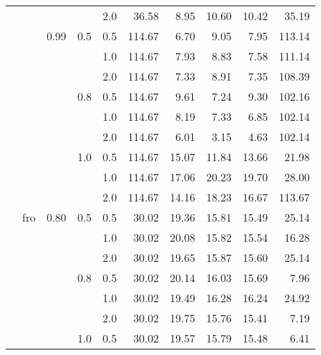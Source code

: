 \documentclass{article}
\begin{document}
{\begin{tabular}{lllllrrrrr}
            &     &      &     & 2.0 &   36.58 &    8.95 &             10.60 &                10.42 &      35.19 \\
            &     & 0.99 & 0.5 & 0.5 &  114.67 &    6.70 &              9.05 &                 7.95 &     113.14 \\
            &     &      &     & 1.0 &  114.67 &    7.93 &              8.83 &                 7.58 &     111.14 \\
            &     &      &     & 2.0 &  114.67 &    7.33 &              8.91 &                 7.35 &     108.39 \\
            &     &      & 0.8 & 0.5 &  114.67 &    9.61 &              7.24 &                 9.30 &     102.16 \\
            &     &      &     & 1.0 &  114.67 &    8.19 &              7.33 &                 6.85 &     102.14 \\
            &     &      &     & 2.0 &  114.67 &    6.01 &              3.15 &                 4.63 &     102.14 \\
            &     &      & 1.0 & 0.5 &  114.67 &   15.07 &             11.84 &                13.66 &      21.98 \\
            &     &      &     & 1.0 &  114.67 &   17.06 &             20.23 &                19.70 &      28.00 \\
            &     &      &     & 2.0 &  114.67 &   14.16 &             18.23 &                16.67 &     113.67 \\
            & fro & 0.80 & 0.5 & 0.5 &   30.02 &   19.36 &             15.81 &                15.49 &      25.14 \\
            &     &      &     & 1.0 &   30.02 &   20.08 &             15.82 &                15.54 &      16.28 \\
            &     &      &     & 2.0 &   30.02 &   19.65 &             15.87 &                15.60 &      25.14 \\
            &     &      & 0.8 & 0.5 &   30.02 &   20.14 &             16.03 &                15.69 &       7.96 \\
            &     &      &     & 1.0 &   30.02 &   19.49 &             16.28 &                16.24 &      24.92 \\
            &     &      &     & 2.0 &   30.02 &   19.75 &             15.76 &                15.41 &       7.19 \\
            &     &      & 1.0 & 0.5 &   30.02 &   19.57 &             15.79 &                15.48 &       6.41 \\

\end{tabular}}
\end{document}
